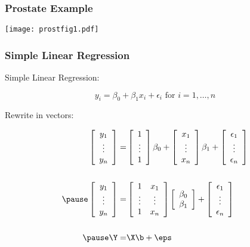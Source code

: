 \documentclass[handout]{beamer}
\begin{document}
\begin{frame}
  \frametitle{Prostate Example}
  \begin{center}
 \texttt{[image: prostfig1.pdf]} 
    
  \end{center}
\end{frame}
\begin{frame} \frametitle{Simple Linear Regression}
Simple Linear Regression:

$$y_i = \beta_0 + \beta_1 x_i + \epsilon_i \text{  for  } i = 1,
\ldots, n$$  \pause
 
Rewrite in vectors:

\begin{eqnarray*}
  \left[
\begin{array}{c}  y_1 \\ \vdots \\  y_n \end{array} 
  \right]   =  & 
 \left[ \begin{array}{c}  1 \\ \vdots \\ 1 \end{array}  \right]   \beta_0 + 
 \left[ \begin{array}{c}  x_1 \\ \vdots \\  x_n \end{array}
 \right] \beta_1 + 
\left[ \begin{array}{c}  \epsilon_1 \\ \vdots \\ \epsilon_n  \end{array}
\right]
\\
 & \\ \pause
\left[
\begin{array}{c}  y_1 \\ \vdots \\  y_n \end{array} 
  \right]   =  & 
 \left[ \begin{array}{cc}  1 &  x_1 \\ \vdots & \vdots \\ 1 & x_n\end{array}  \right]   
 \left[ \begin{array}{c}  \beta_0  \\  \beta_1 \end{array}
 \right] + 
\left[ \begin{array}{c}  \epsilon_1 \\ \vdots \\ \epsilon_n  \end{array}
\right] \\
 & \\ \pause
\Y = & \X \b + \eps
\end{eqnarray*}
\end{frame}
\end{document}
